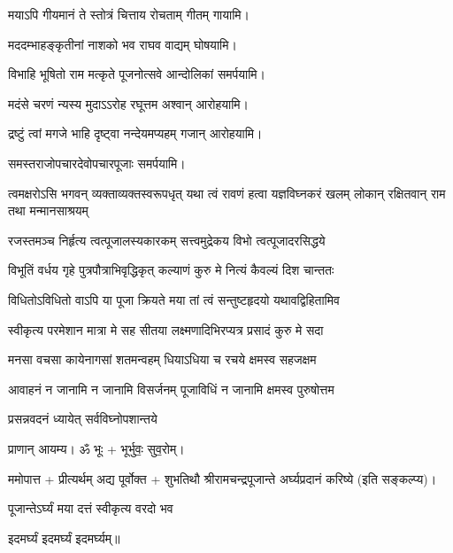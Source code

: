 {मयाऽपि गीयमानं ते स्तोत्रं चित्ताय रोचताम्}
\hfill गीतम् गायामि।


{मददम्भाहङ्कृतीनां नाशको भव राघव}
\hfill वाद्यम् घोषयामि।


{विभाहि भूषितो राम मत्कृते पूजनोत्सवे}
\hfill आन्दोलिकां समर्पयामि।


{मदंसे चरणं न्यस्य मुदाऽऽरोह रघूत्तम}
\hfill अश्वान् आरोहयामि।


{द्रष्टुं त्वां मगजे भाहि दृष्ट्वा नन्देयमप्यहम्}
\hfill गजान् आरोहयामि।

समस्तराजोपचारदेवोपचारपूजाः समर्पयामि।

\resetShloka
\threelineshloka
{त्वमक्षरोऽसि भगवन् व्यक्ताव्यक्तस्वरूपधृत्}
{यथा त्वं रावणं हत्वा यज्ञविघ्नकरं खलम्}
{लोकान् रक्षितवान् राम तथा मन्मानसाश्रयम्}

\twolineshloka
{रजस्तमञ्च निर्हृत्य त्वत्पूजालस्यकारकम्}
{सत्त्वमुद्रेकय विभो त्वत्पूजादरसिद्धये}

\twolineshloka
{विभूतिं वर्धय गृहे पुत्रपौत्राभिवृद्धिकृत्}
{कल्याणं कुरु मे नित्यं कैवल्यं दिश चान्ततः}

\twolineshloka
{विधितोऽविधितो वाऽपि या पूजा क्रियते मया}
{तां त्वं सन्तुष्टहृदयो यथावद्विहितामिव}

\twolineshloka
{स्वीकृत्य परमेशान मात्रा मे सह सीतया}
{लक्ष्मणादिभिरप्यत्र प्रसादं कुरु मे सदा}

\twolineshloka
{मनसा वचसा कायेनागसां शतमन्वहम्}
{धियाऽधिया च रचये क्षमस्व सहजक्षम}

\twolineshloka
{आवाहनं न जानामि न जानामि विसर्जनम्}
{पूजाविधिं न जानामि क्षमस्व पुरुषोत्तम}



{प्रसन्नवदनं ध्यायेत् सर्वविघ्नोपशान्तये}


प्राणान्  आयम्य।  ॐ भूः + भूर्भुवः॒ सुव॒रोम्।

ममोपात्त + प्रीत्यर्थम् अद्य पूर्वोक्त + शुभतिथौ श्रीरामचन्द्रपूजान्ते अर्घ्यप्रदानं करिष्ये (इति सङ्कल्प्य)।

{पूजान्तेऽर्घ्यं मया दत्तं स्वीकृत्य वरदो भव}

\devAya{} इदमर्घ्यं इदमर्घ्यं इदमर्घ्यम्॥

